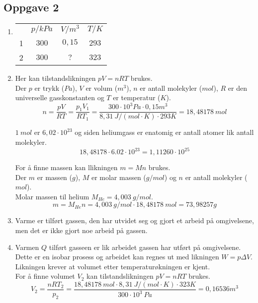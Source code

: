 \documentclass{report}%
\newcommand{\opg}[1]{\subsection*{Oppgave #1}}
\newcommand{\opgd}[1]{\item}
\begin{document}
\newpage
\opg{2}
\begin{enumerate}[leftmargin=*,itemsep=1cm,labelsep=2em,label=\alph*)]
\item[]
\begin{tabular}{ c|c|c|c }
  & $p/kPa$ & $V/m^3$ & $T/K$  \\
1 & $300$   & $0,15$  & $293$ \\
2 & $300$   & $?$     & $323$ \\
\end{tabular}

\opgd{a}
Her kan tilstandslikningen $pV=nRT$ brukes.\\
Der $p$ er trykk ($Pa$), $V$ er volum ($m^3$), $n$ er antall molekyler ($mol$), $R$ er den universelle gasskonstanten og $T$ er temperatur ($K$).
$$n=\frac{pV}{RT} = \frac{p_1V_1}{RT_1} = \frac{300 \cdot 10^3 Pa \cdot 0,15 m^3}{8,31\ J/(mol \cdot K) \cdot 293K} = 18,48178\ mol$$

$1\ mol$ er $6,02 \cdot 10^{23}$ og siden heliumgass er enatomig er antall atomer lik antall molekyler.\\
$$18,48178 \cdot 6.02 \cdot 10^{23} = 1,11260 \cdot 10^{25}$$

For å finne massen kan llikningen $m=Mn$ brukes.\\
Der $m$ er massen ($g$), $M$ er molar massen ($g/mol$) og $n$ er antall molekyler ($mol$).\\
Molar massen til helium $M_{He} = 4,003\ g/mol$.
$$m=M_{He}n=4,003\ g/mol \cdot 18,48178\ mol = 73,98257g$$
\begin{center}\end{center}

\opgd{b}
Varme er tilført gassen, den har utvidet seg og gjort et arbeid på omgivelsene, men det er ikke gjort noe arbeid på gassen.

\opgd{c}
Varmen $Q$ tilført gasseen er lik arbeidet gassen har utført på omgivelsene.\\
Dette er en isobar prosess og arbeidet kan regnes ut med likningen $W = p \Delta V$.\\
Likningen krever at volumet etter temperaturøkningen er kjent.\\
For å finne volumet $V_ 2$ kan tilstandslikningen $pV = nRT$ brukes.
$$V_2 = \frac{nRT_2}{p_2} = \frac{18,48178\ mol \cdot 8,31\ J/(mol \cdot K) \cdot 323K}{300 \cdot 10^3\ Pa} = 0,16536m^3$$


\end{enumerate}
\end{document}
